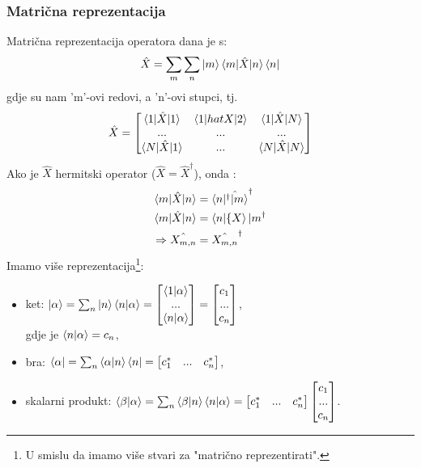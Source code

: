 \documentclass{article}
\numberwithin{equation}{section}
\begin{document}
\subsubsection{Matrična reprezentacija}
Matrična reprezentacija operatora dana je s:
\begin{equation}
	\hat{X} = \sum_m\sum_n \ket{m}\braket{m|\hat{X}|n}\bra{n}
\end{equation}
gdje su nam 'm'-ovi redovi, a 'n'-ovi stupci, tj.
\begin{equation}
	\hat{X} = 
\begin{bmatrix}
	\braket{1|\hat{X}|1} & \braket{1|hat{X}|2} & \braket{1|\hat{X}|N}\\
	... & ... & ...\\
	\braket{N|\hat{X}|1}& ...& \braket{N|\hat{X}|N}
\end{bmatrix}
\end{equation}
Ako je $\hat{X}$ hermitski operator ($\hat{X} = \hat{X}^{\dagger}$), onda :
\begin{equation}
	\begin{aligned}
		\braket{m|\hat{X}|n} &= \braket{n|\hat{^{\dagger}|m}}^{\dagger}\\
		\braket{m|\hat{X}|n} &= \braket{n|\{X}|m^{\dagger}\\
			\Rightarrow \hat{X_{m,n}} &= \hat{X_{m,n}}^{\dagger}
	\end{aligned}
\end{equation}
Imamo više reprezentacija\footnote{U smislu da imamo više stvari za "matrično reprezentirati".}:
\begin{itemize}
	\item ket: $\ket{\alpha} = \sum_n\ket{n}\braket{n|\alpha} =
				\begin{bmatrix} \braket{1|\alpha}\\ ...\\ \braket{n|\alpha} \end{bmatrix} 
				= \begin{bmatrix} c_1\\ ...\\ c_n  \end{bmatrix}$,\\
				gdje je $\braket{n|\alpha} = c_n$,
	\item bra: $\bra{\alpha} = \sum_n \braket{\alpha|n}\bra{n} = \begin{bmatrix} c_1^* & ... & c_n^* \end{bmatrix}$,
	\item skalarni produkt: $\braket{\beta|\alpha} = \sum_n \braket{\beta|n}\braket{n|\alpha}=
				\begin{bmatrix} c_1^* & ... & c_n^* \end{bmatrix} \begin{bmatrix} c_1\\ ...\\ c_n  \end{bmatrix}$.
\end{itemize}
\end{document}
